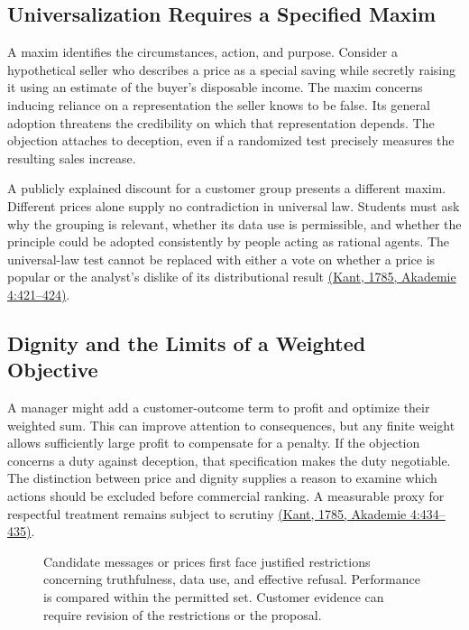 \hypertarget{M09-universalization-requires-a-specified-maxim}{%
\subsection{Universalization Requires a Specified
Maxim}\label{M09-universalization-requires-a-specified-maxim}}

\noindent A maxim identifies the circumstances, action, and purpose. Consider a
hypothetical seller who describes a price as a special saving while
secretly raising it using an estimate of the buyer's disposable income.
The maxim concerns inducing reliance on a representation the seller
knows to be false. Its general adoption threatens the credibility on
which that representation depends. The objection attaches to deception,
even if a randomized test precisely measures the resulting sales
increase.

A publicly explained discount for a customer group presents a different
maxim. Different prices alone supply no contradiction in universal law.
Students must ask why the grouping is relevant, whether its data use is
permissible, and whether the principle could be adopted consistently by
people acting as rational agents. The universal-law test cannot be
replaced with either a vote on whether a price is popular or the
analyst's dislike of its distributional result
\href{https://www.gutenberg.org/ebooks/5682}{(Kant, 1785, Akademie
4:421--424)}.

\hypertarget{M09-dignity-and-the-limits-of-a-weighted-objective}{%
\subsection{Dignity and the Limits of a Weighted
Objective}\label{M09-dignity-and-the-limits-of-a-weighted-objective}}

\noindent A manager might add a customer-outcome term to profit and optimize their
weighted sum. This can improve attention to consequences, but any finite
weight allows sufficiently large profit to compensate for a penalty. If
the objection concerns a duty against deception, that specification
makes the duty negotiable. The distinction between price and dignity
supplies a reason to examine which actions should be excluded before
commercial ranking. A measurable proxy for respectful treatment remains
subject to scrutiny \href{https://www.gutenberg.org/ebooks/5682}{(Kant,
1785, Akademie 4:434--435)}.

\begin{figure}[htbp]
\centering

\caption{Candidate messages or prices first face justified restrictions concerning truthfulness, data use, and effective refusal. Performance is compared within the permitted set. Customer evidence can require revision of the restrictions or the proposal.}\label{fig:M09_optimization_boundary}
\end{figure}

